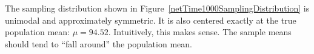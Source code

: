 %


The sampling distribution shown in Figure~\ref{netTime1000SamplingDistribution} is unimodal and approximately symmetric. It is also centered exactly at the true population mean: $\mu=94.52$. Intuitively, this makes sense. The sample means should tend to ``fall around'' the population mean.

%
%
%
%

